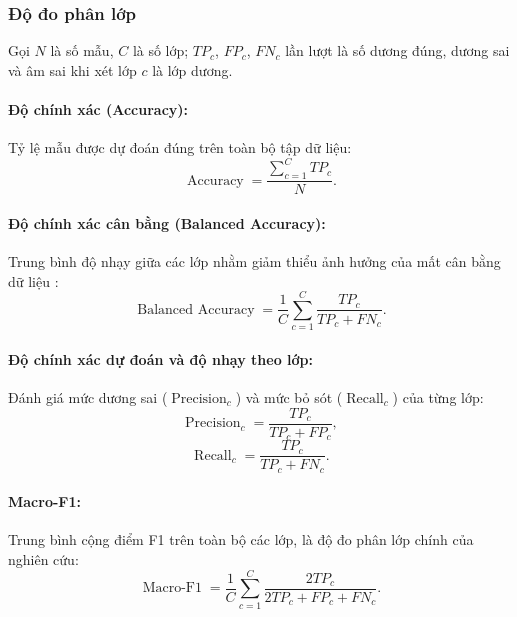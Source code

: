 \subsubsection{Độ đo phân lớp}

Gọi $N$ là số mẫu, $C$ là số lớp; $TP_c$, $FP_c$, $FN_c$ lần lượt là số dương đúng, dương sai và âm sai khi xét lớp $c$ là lớp dương.

\paragraph{Độ chính xác (Accuracy):} Tỷ lệ mẫu được dự đoán đúng trên toàn bộ tập dữ liệu:
\begin{equation}
\operatorname{Accuracy}=\frac{\sum_{c=1}^{C}TP_c}{N}.
\label{eq:ch4_accuracy}
\end{equation}

\paragraph{Độ chính xác cân bằng (Balanced Accuracy):} Trung bình độ nhạy giữa các lớp nhằm giảm thiểu ảnh hưởng của mất cân bằng dữ liệu \cite{Brodersen2010BalancedAcc}:
\begin{equation}
\operatorname{Balanced\ Accuracy}
=\frac{1}{C}\sum_{c=1}^{C}\frac{TP_c}{TP_c+FN_c}.
\label{eq:ch4_balanced_accuracy}
\end{equation}

\paragraph{Độ chính xác dự đoán và độ nhạy theo lớp:} Đánh giá mức dương sai ($\operatorname{Precision}_c$) và mức bỏ sót ($\operatorname{Recall}_c$) của từng lớp:
\begin{equation}
\operatorname{Precision}_c=\frac{TP_c}{TP_c+FP_c},
\label{eq:ch4_precision_def}
\end{equation}
\begin{equation}
\operatorname{Recall}_c=\frac{TP_c}{TP_c+FN_c}.
\label{eq:ch4_recall_def}
\end{equation}

\paragraph{Macro-F1:} Trung bình cộng điểm F1 trên toàn bộ các lớp, là độ đo phân lớp chính của nghiên cứu:
\begin{equation}
\operatorname{Macro\text{-}F1}
=\frac{1}{C}\sum_{c=1}^{C}\frac{2TP_c}{2TP_c+FP_c+FN_c}.
\label{eq:ch4_macro_f1}
\end{equation}


